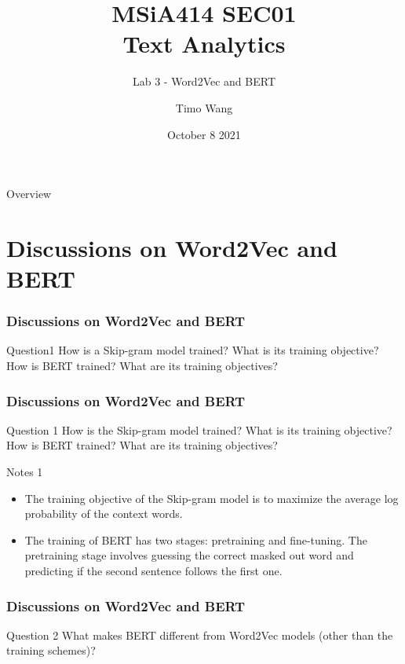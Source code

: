 \documentclass{beamer}
\begin{document}
\title{MSiA414 SEC01\\ Text Analytics}
\subtitle{Lab 3 - Word2Vec and BERT}
\author{Timo Wang}
\date{October 8 2021}

\begin{frame}
    \titlepage
\end{frame}

\begin{frame}{Overview}
    \tableofcontents[hideallsubsections]
\end{frame}

\section{Discussions on Word2Vec and BERT}
\begin{frame}
    \frametitle{Discussions on Word2Vec and BERT}
    \begin{block}{Question1 }
        How is a Skip-gram model trained? What is its training objective? 
    How is BERT trained? What are its training objectives?
    \end{block}
\end{frame}

\begin{frame}
    \frametitle{Discussions on Word2Vec and BERT}
    \begin{block}{Question 1}
        How is the Skip-gram model trained? What is its training objective? 
    How is BERT trained? What are its training objectives?
    \end{block}
    \begin{block}{Notes 1}
        \begin{itemize}
            \item The training objective of the Skip-gram model is to maximize the average log probability of the context words.
            \item The training of BERT has two stages: pretraining and fine-tuning. The pretraining stage involves guessing the correct masked out word and predicting if the second sentence follows the first one.
        \end{itemize}
    \end{block}
\end{frame}

\begin{frame}
    \frametitle{Discussions on Word2Vec and BERT}
    \begin{block}{Question 2}
        What makes BERT different from Word2Vec models (other than the training schemes)? 
    \end{block}
\end{frame}
\end{document}

